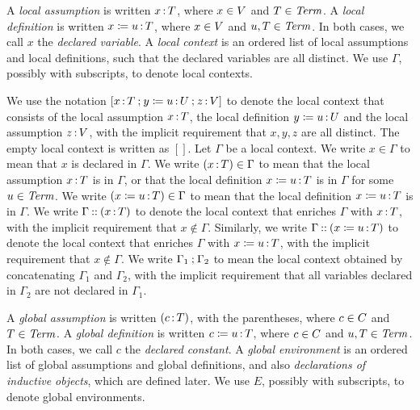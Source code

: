 \documentclass{article}
\begin{document}
\begin{definition}
A \emph{local assumption} is written $x {\,:\,} T$, where $x \in V$ and $T \in 
\textnormal{\textit{Term}}$. 
A \emph{local definition} is written $x \coloneqq u {\,:\,} T$,
where $x \in V$ and $u,T \in \textnormal{\textit{Term}}$.
In both cases, we call $x$ the \emph{declared variable}. 
A \emph{local context} is an ordered list of local assumptions and local 
definitions, such that the declared variables are all distinct. 
We use $\Gamma$, possibly with subscripts, to denote local contexts. 
\end{definition}

\begin{notation}\label{not:ldcl}
We use the notation $[x {\,:\,} T \mathbin{;} y \coloneqq u {\,:\,} U \mathbin{;} z {\,:\,} V]$
to denote the local context that consists of
the local assumption $x {\,:\,} T$,
the local definition $y \coloneqq u {\,:\,} U$
and the local assumption $z {\,:\,} V$,
with the implicit requirement that $x,y,z$ are all distinct.
The empty local context is written as $[]$. 
Let $\Gamma$ be a local context. 
We write $x \in \Gamma$ to mean that $x$ is declared in $\Gamma$.
We write $(x {\,:\,} T) \in \Gamma$ to mean that the local assumption
$x {\,:\,} T$ is in $\Gamma$, or that
the local definition $x \coloneqq u {\,:\,} T$ is in $\Gamma$ for some $u \in \textnormal{\textit{Term}}$.
We write $(x \coloneqq u {\,:\,} T) \in \Gamma$ to mean that
the local definition $x \coloneqq u {\,:\,} T$ is in $\Gamma$.
We write $\Gamma \mathbin{::} ( x {\,:\,} T )$ to denote the local context
that enriches $\Gamma$ with $x {\,:\,} T$, with the implicit requirement that 
$x \not\in \Gamma$.
Similarly, we write 
$\Gamma \mathbin{::} ( x \coloneqq u {\,:\,} T )$ to denote the local context
that enriches $\Gamma$ with $x \coloneqq u {\,:\,} T$, with the implicit requirement 
that $x \not\in \Gamma$.
We write $\Gamma_1 \mathbin{;} \Gamma_2$ to mean the local context
obtained by concatenating $\Gamma_1$ and $\Gamma_2$, with the implicit 
requirement that all variables declared in $\Gamma_2$ are not declared in 
$\Gamma_1$. 
\end{notation}

\begin{definition}
A \emph{global assumption} is written $(c {\,:\,} T)$,
with the parentheses, where $c \in C$ and $T \in 
\textnormal{\textit{Term}}$. 
A \emph{global definition} is written $c \coloneqq u {\,:\,} T$,
where $c \in C$ and $u,T \in \textnormal{\textit{Term}}$.
In both cases, we call $c$ the \emph{declared constant}. 
A \emph{global environment} is an ordered list of global assumptions and global
definitions, and also \emph{declarations of inductive objects}, which are 
defined later. 
We use $E$, possibly with subscripts, to denote global environments.
\end{definition}
\end{document}
